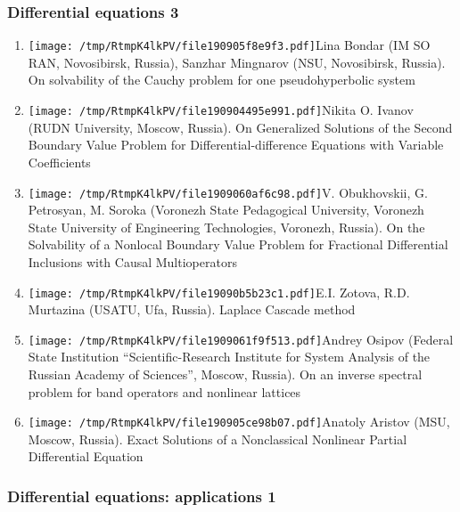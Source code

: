 \documentclass[
]{article}
\providecommand{\tightlist}{%
  \setlength{\itemsep}{0pt}\setlength{\parskip}{0pt}}
\begin{document}
\hypertarget{de3}{%
\subsubsection{Differential equations 3}\label{de3}}

\begin{enumerate}
\def\labelenumi{\arabic{enumi}.}
\tightlist
\item
  \protect\texttt{[image: /tmp/RtmpK4lkPV/file190905f8e9f3.pdf]}Lina
  Bondar (IM SO RAN, Novosibirsk, Russia), Sanzhar Mingnarov (NSU,
  Novosibirsk, Russia). On solvability of the Cauchy problem for one
  pseudohyperbolic system
\item
  \protect\texttt{[image: /tmp/RtmpK4lkPV/file190904495e991.pdf]}Nikita
  O. Ivanov (RUDN University, Moscow, Russia). On Generalized Solutions
  of the Second Boundary Value Problem for Differential-difference
  Equations with Variable Coefficients
\item
  \protect\texttt{[image: /tmp/RtmpK4lkPV/file1909060af6c98.pdf]}V.
  Obukhovskii, G. Petrosyan, M. Soroka (Voronezh State Pedagogical
  University, Voronezh State University of Engineering Technologies,
  Voronezh, Russia). On the Solvability of a Nonlocal Boundary Value
  Problem for Fractional Differential Inclusions with Causal
  Multioperators
\item
  \protect\texttt{[image: /tmp/RtmpK4lkPV/file19090b5b23c1.pdf]}E.I.
  Zotova, R.D. Murtazina (USATU, Ufa, Russia). Laplace Cascade method
\item
  \protect\texttt{[image: /tmp/RtmpK4lkPV/file1909061f9f513.pdf]}Andrey
  Osipov (Federal State Institution ``Scientific-Research Institute for
  System Analysis of the Russian Academy of Sciences'', Moscow, Russia).
  On an inverse spectral problem for band operators and nonlinear
  lattices
\item
  \protect\texttt{[image: /tmp/RtmpK4lkPV/file190905ce98b07.pdf]}Anatoly
  Aristov (MSU, Moscow, Russia). Exact Solutions of a Nonclassical
  Nonlinear Partial Differential Equation
\end{enumerate}

\hypertarget{dea1}{%
\subsubsection{Differential equations: applications 1}\label{dea1}}
\end{document}
